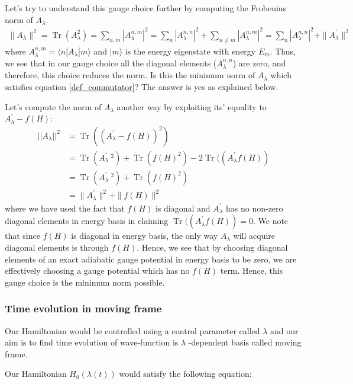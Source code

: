 \documentclass[11pt,a4paper]{article}
\DeclareMathOperator{\Tr}{Tr}
\begin{document}
Let's try to understand this gauge choice further by computing the Frobenius norm of $A_{\lambda}$. 
\begin{align}
\|A_{\lambda}\|^2= \Tr ( A_{\lambda} ^2)= \sum_{n, m} |A_{\lambda}^{n,m}|^2=\sum_{n} |A_{\lambda}^{n,n}|^2+ \sum_{n \neq m} |A_{\lambda}^{n,m}|^2 =  \sum_{n} |A_{\lambda}^{n,n}|^2+ \| A_{\lambda}^{\prime} \| ^2
\end{align}
where $A_{\lambda}^{n,m}= \langle n |A_{\lambda}|m \rangle$ and $|m \rangle$ is the energy eigenstate with energy $E_m$. Thus, we see that in our gauge choice all the diagonal elements ($A_{\lambda}^{n,n}$) are zero, and therefore,  this choice reduces the norm. Is this the minimum norm of  $A_{\lambda}$ which satisfies equation \ref{def_commutator}? The answer is yes as explained below.



Let's compute the norm of $A_{\lambda}$ another way by exploiting its' equality to $A_{\lambda}^{\prime} - f(H)$: 
\begin{align}
|| A_{\lambda} ||^2 &= \Tr ( (  A_{\lambda}^{\prime} - f(H) )^2) \\
&= \Tr ( A_{\lambda}^{\prime}\ ^2)  + \Tr(f(H)^2) - 2  \Tr (( A_{\lambda}^{\prime} f(H))  \\
&= \Tr ( A_{\lambda}^{\prime}\ ^2)  + \Tr(f(H)^2) \\
&=\| A_{\lambda}^{\prime} \| ^2 + \| f(H) \| ^2
\end{align}
where we have used  the fact that $f(H)$ is diagonal and $A_{\lambda}^{\prime} $ has no non-zero diagonal elements in energy basis in claiming $\Tr (( A_{\lambda}^{\prime} f(H))=0 $.  We note that since $f(H)$ is diagonal in energy basis, the only way $A_{\lambda}$ will acquire diagonal elements is through $f(H)$. Hence, we see that by choosing diagonal elements of an exact adiabatic gauge potential in energy basis to be zero, we are effectively choosing a gauge potential which has no $f(H)$ term. Hence, this gauge choice is the minimum norm possible.



\subsubsection{Time evolution in moving frame}
Our Hamiltonian would be controlled using a control parameter called $\lambda$ and our aim is to find time evolution of wave-function is $\lambda$ -dependent basis called moving frame.

Our Hamiltonian $H_0(\lambda (t))$ would satisfy the following equation:
\end{document}
